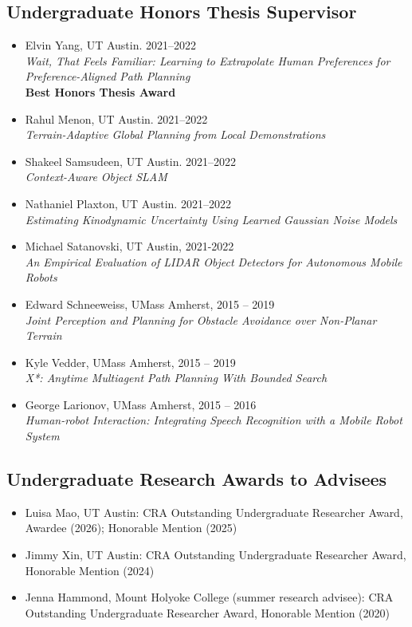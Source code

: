 \documentclass[Times]{article}
\begin{document}
\subsection*{Undergraduate Honors Thesis Supervisor}
\begin{itemize}
 \item Elvin Yang, UT Austin. 2021--2022\\
 \emph{Wait, That Feels Familiar: Learning to Extrapolate Human Preferences for Preference-Aligned Path Planning}\\
 \textbf{Best Honors Thesis Award}
 \item Rahul Menon, UT Austin. 2021--2022\\
 \emph{Terrain-Adaptive Global Planning from Local Demonstrations}
 \item Shakeel Samsudeen, UT Austin. 2021--2022\\
 \emph{Context-Aware Object SLAM}
 \item Nathaniel Plaxton, UT Austin. 2021--2022\\
 \emph{Estimating Kinodynamic Uncertainty Using Learned Gaussian Noise Models}
 \item Michael Satanovski, UT Austin, 2021-2022\\
 \emph{An Empirical Evaluation of LIDAR Object Detectors for Autonomous Mobile Robots}
 \item Edward Schneeweiss, UMass Amherst, 2015 -- 2019\\
  \emph{Joint Perception and Planning for Obstacle Avoidance over Non-Planar Terrain}
 \item Kyle Vedder, UMass Amherst, 2015 -- 2019\\
  \emph{X*: Anytime Multiagent Path Planning With Bounded Search}
 \item George Larionov, UMass Amherst, 2015 -- 2016\\
  \emph{Human-robot Interaction: Integrating Speech Recognition with a Mobile Robot System}
\end{itemize}

\subsection*{Undergraduate Research Awards to Advisees}
\begin{itemize}
 \item Luisa Mao, UT Austin: CRA Outstanding Undergraduate Researcher Award, Awardee (2026); Honorable Mention (2025)
 \item Jimmy Xin, UT Austin: CRA Outstanding Undergraduate Researcher Award, Honorable Mention (2024)
 \item Jenna Hammond, Mount Holyoke College (summer research advisee): CRA Outstanding Undergraduate Researcher Award, Honorable Mention (2020)
\end{itemize}
\end{document}
